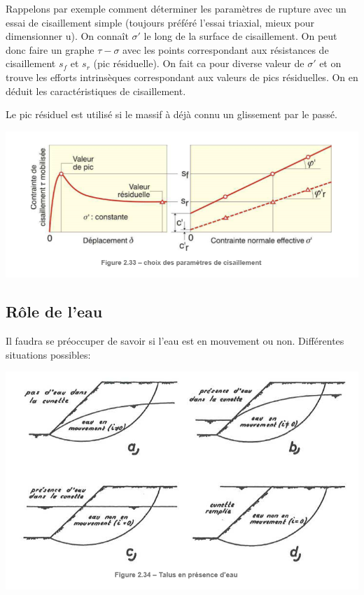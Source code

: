 Rappelons par exemple comment déterminer les paramètres de rupture avec un essai de cisaillement simple (toujours préféré l'essai triaxial, mieux pour dimensionner u). On connaît $\sigma'$ le long de la surface de cisaillement. On peut donc faire un graphe $\tau - \sigma$ avec les points correspondant aux résistances de cisaillement $s_f$ et $s_r$ (pic résiduelle). On fait ca pour diverse valeur de $\sigma'$ et on trouve les efforts intrinsèques correspondant aux valeurs de pics résiduelles. On en déduit les caractéristiques de cisaillement.

Le pic résiduel est utilisé si le massif à déjà connu un glissement par le passé.

\begin{center}
\includegraphics [scale=0.8]{pictures/233.PNG}
\end{center}

\subsection{Rôle de l'eau}

Il faudra se préoccuper de savoir si l'eau est en mouvement ou non. Différentes situations possibles:

\begin{center}
\includegraphics [scale=0.8]{pictures/234.PNG}
\end{center}

